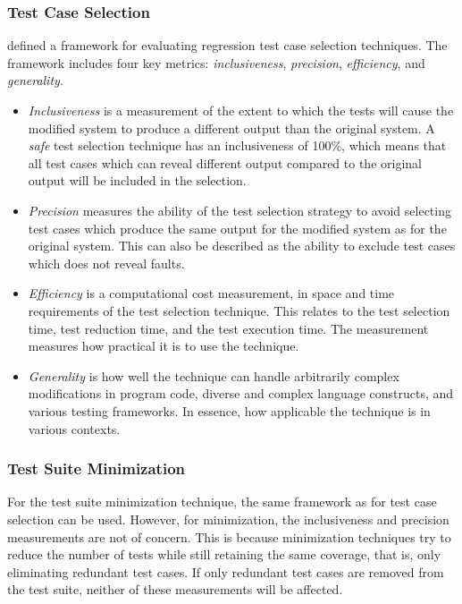 \documentclass[a4paper,english,12pt]{report}
\begin{document}
\subsubsection{Test Case Selection}\label{sec:test-cases-selection-metrics}
\citet[p. 529]{rothermel1996analyzing} defined a framework for evaluating regression test case selection techniques. The framework includes four key metrics: \textit{inclusiveness}, \textit{precision}, \textit{efficiency}, and \textit{generality}.

\begin{itemize}
  \item\textit{Inclusiveness} is a measurement of the extent to which the tests will cause the modified system to produce a different output than the original system. A \textit{safe} test selection technique has an inclusiveness of 100\%, which means that all test cases which can reveal different output compared to the original output will be included in the selection.
  \item\textit{Precision} measures the ability of the test selection strategy to avoid selecting test cases which produce the same output for the modified system as for the original system. This can also be described as the ability to exclude test cases which does not reveal faults.
  \item\textit{Efficiency} is a computational cost measurement, in space and time requirements of the test selection technique. This relates to the test selection time, test reduction time, and the test execution time. The measurement measures how practical it is to use the technique.
  \item\textit{Generality} is how well the technique can handle arbitrarily complex modifications in program code, diverse and complex language constructs, and various testing frameworks. In essence, how applicable the technique is in various contexts.
\end{itemize} 	

\subsubsection{Test Suite Minimization}
For the test suite minimization technique, the same framework as for test case selection can be used. However, for minimization, the inclusiveness and precision measurements are not of concern. This is because minimization techniques try to reduce the number of tests while still retaining the same coverage, that is, only eliminating redundant test cases. If only redundant test cases are removed from the test suite, neither of these measurements will be affected. \citep[p. 247]{runeson2012regression}
\end{document}
